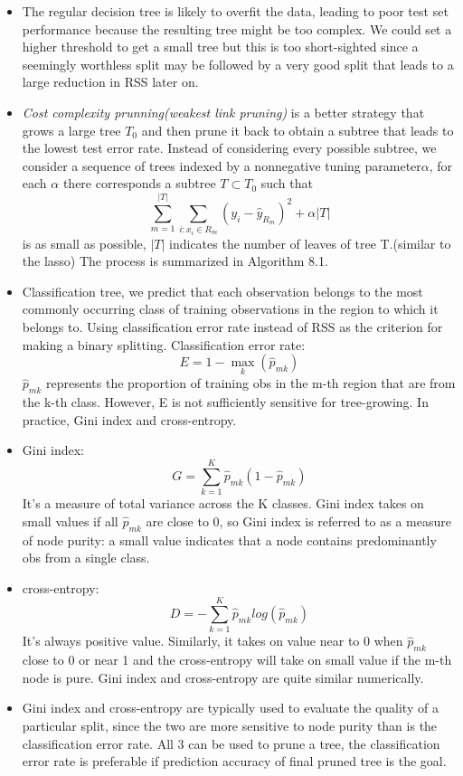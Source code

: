 \documentclass[a4paper, 12pt]{article}
\begin{document}
\begin{itemize}
	\item The regular decision tree is likely to overfit the data, leading to poor test set performance because the resulting tree might be too complex. We could set a higher threshold to get a small tree but this is too short-sighted since a seemingly worthless split may be followed by a very good split that leads to a large reduction in RSS later on.
	\item \textit{Cost complexity prunning(weakest link pruning)} is a better strategy that grows a large tree $T_0$ and then prune it back to obtain a subtree that leads to the lowest test error rate. Instead of considering every possible subtree, we consider a sequence of trees indexed by a nonnegative tuning parameter$\alpha$, for each $\alpha$ there corresponds a subtree $T\subset T_0$ such that 
	\[ \sum_{m=1}^{|T|}\sum_{i: x_i \in R_m }(y_i-\hat{y}_{R_m})^2 + \alpha|T|
	\]
	is as small as possible, $|T|$ indicates the number of leaves of tree T.(similar to the lasso) The process is summarized in Algorithm 8.1.
	\item Classification tree, we predict that each observation belongs to the most commonly occurring class of training observations in the region to which it belongs to. Using classification error rate instead of RSS as the criterion for making a binary splitting. Classification error rate:
	\[ E=1-\displaystyle{\max_{k}}(\hat{p}_{mk})
	\]
	$\hat{p}_{mk}$ represents the proportion of training obs in the m-th region that are from the k-th class. However, E is not sufficiently sensitive for tree-growing. In practice, Gini index and cross-entropy.
	\item Gini index:\[
	G=\sum_{k=1}^{K}\hat{p}_{mk}(1-\hat{p}_{mk}) \]
	It's a measure of total variance across the K classes. Gini index takes on small values if all $\hat{p}_{mk}$ are close to 0, so Gini index is referred to as a measure of node purity: a small value indicates that a node contains predominantly obs from a single class.
	\item cross-entropy:\[
	D=-\sum_{k=1}^{K}\hat{p}_{mk} log(\hat{p}_{mk})\]
	It's always positive value. Similarly, it takes on value near to 0 when $\hat{p}_{mk}$ close to 0 or near 1 and the cross-entropy will take on small value if the m-th node is pure. Gini index and cross-entropy are quite similar numerically.
	\item Gini index and cross-entropy are typically used to evaluate the quality of a particular split, since the two are more sensitive to  node purity than is the classification error rate. All 3 can be used to prune a tree, the classification error rate is preferable if prediction accuracy of final pruned tree is the goal.

\end{itemize}
\end{document}
